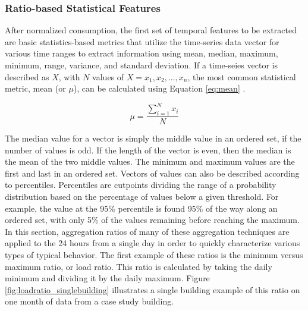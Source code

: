 \subsubsection{Ratio-based Statistical Features}
\label{sec:ratiobasedfeatures}

After normalized consumption, the first set of temporal features to be extracted are basic statistics-based metrics that utilize the time-series data vector for various time ranges to extract information using mean, median, maximum, minimum, range, variance, and standard deviation. If a time-seies vector is described as $X$, with $N$ values of $X = {x_1, x_2,...,x_n}$, the most common statistical metric, mean (or $\mu$), can be calculated using Equation \ref{eq:mean} \cite{Mitsa_2010}.

\begin{equation}
\mu = \frac{\sum\limits_{i=1}^N x_i}{N}
\label{eq:mean}
\end{equation}

The median value for a vector is simply the middle value in an ordered set, if the number of values is odd. If the length of the vector is even, then the median is the mean of the two middle values. The minimum and maximum values are the first and last in an ordered set. Vectors of values can also be described according to percentiles. Percentiles are cutpoints dividing the range of a probability distribution based on the percentage of values below a given threshold. For example, the value at the 95\% percentile is found 95\% of the way along an ordered set, with only 5\% of the values remaining before reaching the maximum. In this section, aggregation ratios of many of these aggregation techniques are applied to the 24 hours from a single day in order to quickly characterize various types of typical behavior. The first example of these ratios is the minimum versus maximum ratio, or load ratio. This ratio is calculated by taking the daily minimum and dividing it by the daily maximum. Figure \ref{fig:loadratio_singlebuilding} illustrates a single building example of this ratio on one month of data from a case study building.